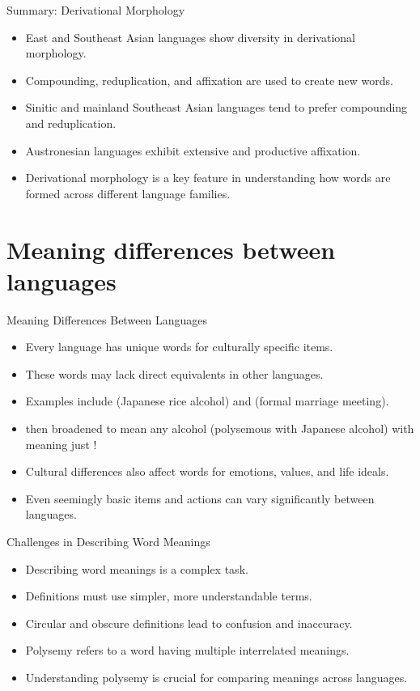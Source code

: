 \documentclass{beamer}
\begin{document}
\begin{frame}{Summary: Derivational Morphology}
    \begin{itemize}
        \item East and Southeast Asian languages show diversity in derivational morphology.
        \item Compounding, reduplication, and affixation are used to create new words.
        \item Sinitic and mainland Southeast Asian languages tend to prefer compounding and reduplication.
        \item Austronesian languages exhibit extensive and productive affixation.
        \item Derivational morphology is a key feature in understanding how words are formed across different language families.
    \end{itemize}
\end{frame}

\section{Meaning differences between languages}

\begin{frame}{Meaning Differences Between Languages}
    \begin{itemize}
        \item Every language has unique words for culturally specific items.
        \item These words may lack direct equivalents in other languages.
        \item Examples include  (Japanese rice alcohol) and  (formal marriage meeting).
          \item  {} then broadened to mean any alcohol (polysemous with Japanese alcohol) with   meaning just  !  
        \item Cultural differences also affect words for emotions, values, and life ideals.
        \item Even seemingly basic items and actions can vary significantly between languages.
    \end{itemize}
\end{frame}

\begin{frame}{Challenges in Describing Word Meanings}
    \begin{itemize}
        \item Describing word meanings is a complex task.
        \item Definitions must use simpler, more understandable terms.
        \item Circular and obscure definitions lead to confusion and inaccuracy.
        \item Polysemy refers to a word having multiple interrelated meanings.
        \item Understanding polysemy is crucial for comparing meanings across languages.
    \end{itemize}
\end{frame}
\end{document}
